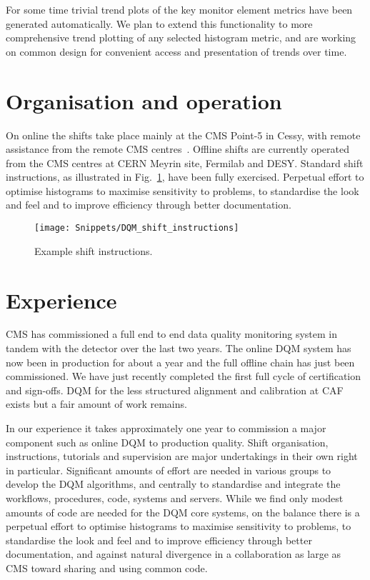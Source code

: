 \documentclass[a4paper]{jpconf}
\begin{document}
For some time trivial trend plots of the key monitor element metrics have been
generated automatically.  We plan to extend this functionality to more
comprehensive trend plotting of any selected histogram metric, and are working
on common design for convenient access and presentation of trends over time.


\section{Organisation and operation}

On online the shifts take place mainly at the CMS Point-5 in Cessy, with
remote assistance from the remote CMS centres~\cite{cms_centres_09}.  Offline
shifts are currently operated from the CMS centres at CERN Meyrin site,
Fermilab and DESY.  Standard shift instructions, as illustrated in
Fig.~\ref{fig:shiftdoc}, have been fully exercised.  Perpetual effort to
optimise histograms to maximise sensitivity to problems, to standardise the
look and feel and to improve efficiency through better documentation.

\begin{figure}[!tbp]
\begin{center}
\texttt{[image: Snippets/DQM\_shift\_instructions]}
\caption{\label{fig:shiftdoc}Example shift instructions.}
\end{center}
\end{figure}


\section{Experience}

CMS has commissioned a full end to end data quality monitoring system in
tandem with the detector over the last two years.  The online DQM system has
now been in production for about a year and the full offline chain has just
been commissioned.  We have just recently completed the first full cycle of
certification and sign-offs.  DQM for the less structured alignment and
calibration at CAF exists but a fair amount of work remains.
 
In our experience it takes approximately one year to commission a major
component such as online DQM to production quality.  Shift organisation,
instructions, tutorials and supervision are major undertakings in their own
right in particular.  Significant amounts of effort are needed in various
groups to develop the DQM algorithms, and centrally to standardise and
integrate the workflows, procedures, code, systems and servers.  While we find
only modest amounts of code are needed for the DQM core systems, on the
balance there is a perpetual effort to optimise histograms to maximise
sensitivity to problems, to standardise the look and feel and to improve
efficiency through better documentation, and against natural divergence in a
collaboration as large as CMS toward sharing and using common code.
\end{document}
